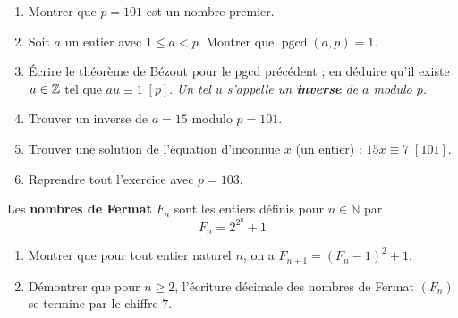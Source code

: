 \documentclass[11pt,class=report,crop=false]{standalone}
\newcommand{\pgcd}{\mathop{\mathrm{pgcd}}\nolimits}
\begin{document}
\finexercice

\exercice{}
\enonce
\sauteligne
\begin{enumerate}
    \item Montrer que $p=101$ est un nombre premier.
    \item Soit $a$ un entier avec $1 \le a < p$. Montrer que $\pgcd(a,p)=1$.
    \item \'Ecrire le théorème de Bézout pour le pgcd précédent ; en déduire qu'il existe $u \in \mathbb{Z}$ tel que $au \equiv 1 \; [p]$. \emph{Un tel $u$ s'appelle un \textbf{inverse} de $a$ modulo $p$.}
    \item Trouver un inverse de $a=15$ modulo $p=101$.
    \item Trouver une solution de l'équation d'inconnue $x$ (un entier) : $15x \equiv 7 \; [101]$.   
    \item Reprendre tout l'exercice avec $p=103$.
\end{enumerate} 
\finenonce


\finexercice


\exercice{}
\enonce
Les \textbf{nombres de Fermat} $F_n$ sont les entiers définis pour $n \in \mathbb{N}$ par 
$$ F_n = 2^{2^n} + 1 $$
\begin{enumerate}
\item Montrer que pour tout entier naturel $n$, on a $F_{n+1} = (F_n - 1)^2 + 1$.
\item Démontrer que pour $n \geq 2$, l'écriture décimale des nombres de Fermat $(F_n)$ se termine par le chiffre $7$.
\end{enumerate}
\finenonce


\finexercice
\end{document}
